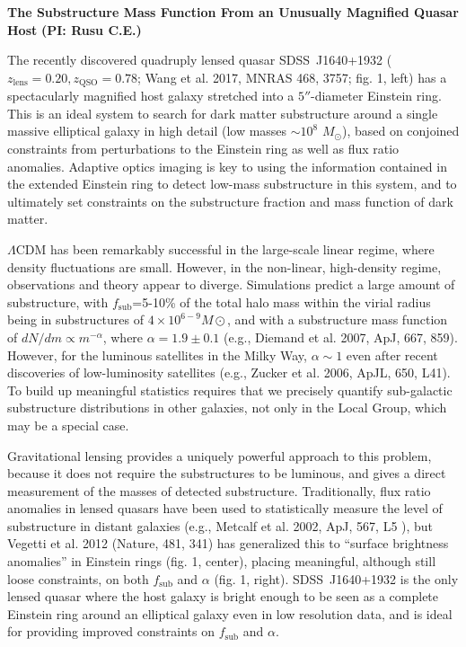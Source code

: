 \documentclass[a4paper,11pt]{article}
\begin{document}
\begin {centering}
{\bf The Substructure Mass Function From an Unusually Magnified Quasar Host} {\bf (PI: Rusu C.E.)}\\
 \end{centering}
 
\medskip

 The recently discovered quadruply lensed quasar SDSS~J1640+1932 ($z_\mathrm{lens}=0.20, z_\mathrm{QSO}=0.78$; Wang et al. 2017, MNRAS 468, 3757; fig. 1, left) has a spectacularly magnified host galaxy stretched into a $5''$-diameter Einstein ring. This is an ideal system to search for  dark matter substructure around a single massive elliptical galaxy in high detail (low masses $\sim10^8$ $M_\odot$), based on conjoined constraints from perturbations to the Einstein ring as well as flux ratio anomalies. Adaptive optics imaging is key to using the information contained in the extended Einstein ring to detect low-mass substructure in this system, and to ultimately set constraints on the substructure fraction and mass function of dark matter.

$\Lambda$CDM has been remarkably successful in the large-scale linear regime, where density fluctuations are small. However, in the non-linear, high-density regime, observations and theory appear to diverge. Simulations predict a large amount of substructure, with $f_\mathrm{sub}$=5-10\% of the total halo mass within the virial radius being in substructures of $4\times10^{6-9} M\odot$, and with a substructure mass function of $dN/dm\propto m^{-\alpha}$, where $\alpha=1.9\pm0.1$ (e.g., Diemand et al. 2007, ApJ, 667, 859). However, for the luminous satellites in the Milky Way, $\alpha\sim1$ even after recent discoveries of low-luminosity satellites (e.g., Zucker et al. 2006, ApJL, 650, L41). To build up meaningful statistics requires that we precisely quantify sub-galactic substructure distributions in other galaxies, not only in the Local Group, which may be a special case. 

Gravitational lensing provides a uniquely powerful approach to this problem, because it does not require the substructures to be luminous, and gives a direct measurement of the masses of detected substructure. Traditionally, flux ratio anomalies in lensed quasars have been used to statistically measure the level of substructure in distant galaxies (e.g., Metcalf et al. 2002, ApJ, 567, L5 ), but Vegetti et al. 2012 (Nature, 481, 341) has generalized this to ``surface brightness anomalies'' in Einstein rings (fig. 1, center), placing meaningful, although still loose constraints, on both $f_\mathrm{sub}$ and $\alpha$ (fig. 1, right). SDSS~J1640+1932 is the only lensed quasar where the host galaxy is bright enough to be seen as a complete Einstein ring around an elliptical galaxy even in low resolution data, and is ideal for providing improved constraints on $f_\mathrm{sub}$ and $\alpha$.
\end{document}
